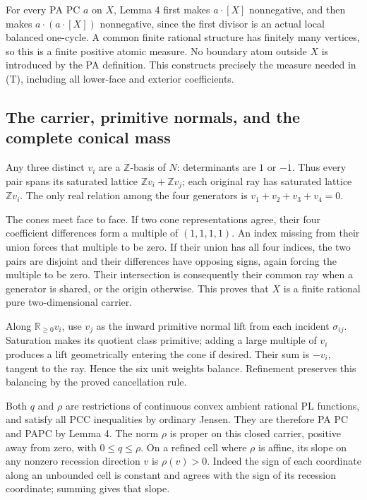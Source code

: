 \documentclass[
  10pt,
]{article}
\begin{document}
For every PA PC \(a\) on \(X\), Lemma 4 first makes \(a\cdot[X]\)
nonnegative, and then makes \(a\cdot(a\cdot[X])\) nonnegative, since the
first divisor is an actual local balanced one-cycle. A common finite
rational structure has finitely many vertices, so this is a finite
positive atomic measure. No boundary atom outside \(X\) is introduced by
the PA definition. This constructs precisely the measure needed in (T),
including all lower-face and exterior coefficients.

\subsection{The carrier, primitive normals, and the complete conical
mass}\label{the-carrier-primitive-normals-and-the-complete-conical-mass}

Any three distinct \(v_i\) are a \(\mathbb Z\)-basis of \(N\):
determinants are \(1\) or \(-1\). Thus every pair spans its saturated
lattice \(\mathbb Z v_i+\mathbb Z v_j\); each original ray has saturated
lattice \(\mathbb Z v_i\). The only real relation among the four
generators is \(v_1+v_2+v_3+v_4=0\).

The cones meet face to face. If two cone representations agree, their
four coefficient differences form a multiple of \((1,1,1,1)\). An index
missing from their union forces that multiple to be zero. If their union
has all four indices, the two pairs are disjoint and their differences
have opposing signs, again forcing the multiple to be zero. Their
intersection is consequently their common ray when a generator is
shared, or the origin otherwise. This proves that \(X\) is a finite
rational pure two-dimensional carrier.

Along \(\mathbb R_{\geq0}v_i\), use \(v_j\) as the inward primitive
normal lift from each incident \(\sigma_{ij}\). Saturation makes its
quotient class primitive; adding a large multiple of \(v_i\) produces a
lift geometrically entering the cone if desired. Their sum is \(-v_i\),
tangent to the ray. Hence the six unit weights balance. Refinement
preserves this balancing by the proved cancellation rule.

Both \(q\) and \(\rho\) are restrictions of continuous convex ambient
rational PL functions, and satisfy all PCC inequalities by ordinary
Jensen. They are therefore PA PC and PAPC by Lemma 4. The norm \(\rho\)
is proper on this closed carrier, positive away from zero, with
\(0\leq q\leq\rho\). On a refined cell where \(\rho\) is affine, its
slope on any nonzero recession direction \(v\) is \(\rho(v)>0\). Indeed
the sign of each coordinate along an unbounded cell is constant and
agrees with the sign of its recession coordinate; summing gives that
slope.
\end{document}
